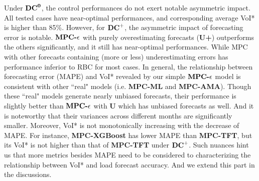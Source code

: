 Under $\mathbf{{DC}^{0}}$, the control performances do not exert notable asymmetric impact. All tested cases have near-optimal performances, and corresponding average VoI* is higher than 85\%. However, for $\mathbf{{DC}^{+}}$, the asymmetric impact of forecasting error is notable. $\textbf{MPC-${\epsilon }$}$ with purely overestimating forecasts (\textbf{U+}) outperforms the others significantly, and it still has near-optimal performances. While MPC with other forecasts containing (more or less) underestimating errors has performance inferior to RBC for most cases. 
In general, the relationship between forecasting error (MAPE) and VoI* revealed by our simple $\textbf{MPC-${\epsilon }$}$ model is consistent with other ``real" models (i.e. \textbf{MPC-ML} and \textbf{MPC-AMA}). Though these ``real" models generate nearly unbiased forecasts, their performance is slightly better than $\textbf{MPC-${\epsilon }$}$ with \textbf{U} which has unbiased forecasts as well. And it is noteworthy that their variances across different months are significantly smaller. Moreover, VoI* is not monotonically increasing with the decrease of MAPE. For instance, \textbf{MPC-XGBoost} has lower MAPE than \textbf{MPC-TFT}, but its VoI* is not higher than that of \textbf{MPC-TFT} under $\mathbf{{DC}^{+}}$. Such nuances hint us that more metrics besides MAPE need to be considered to characterizing the relationship between VoI* and load forecast accuracy. And we extend this part in the discussions. 




  


